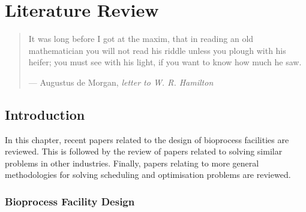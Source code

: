 %
%
%
%

\chapter{Literature Review}\label{C.litreview}

\begin{quote}
It was long before I got at the maxim, that in reading an old mathematician you
will not read his riddle unless you plough with his heifer; you must see with
his light, if you want to know how much he saw.

\hspace{2cm}--- Augustus de Morgan, \emph{letter to W. R. Hamilton}
\end{quote}

\section{Introduction}\label{S.intro2}

In this chapter, recent papers related to the design of bioprocess facilities
are reviewed.  This is followed by the review of papers related to solving
similar problems in other industries.  Finally, papers relating to more
general methodologies for solving scheduling and optimisation problems are
reviewed.

\subsection{Bioprocess Facility Design}\label{SS.bioprocdes}

